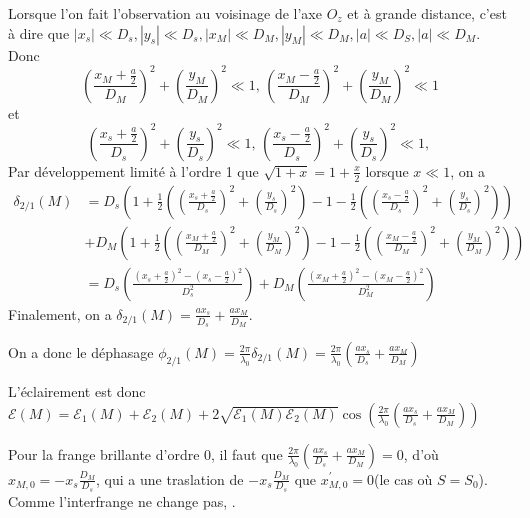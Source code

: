 \documentclass[a4paper,12pt]{book}
\begin{document}
Lorsque l'on fait l'observation au voisinage de l'axe $O_z$ et à grande distance, c'est à dire que 
$|x_s| \ll D_s, |y_s| \ll D_s, |x_M| \ll D_M, |y_M| \ll D_M, |a| \ll D_S, |a| \ll D_M$. 
Donc 
$$
\left(\frac{x_M+\frac{a}{2}}{D_M}\right)^2+\left(\frac{y_M}{D_M}\right)^2\ll 1,\, 
\left(\frac{x_M-\frac{a}{2}}{D_M}\right)^2+\left(\frac{y_M}{D_M}\right)^2\ll 1
$$
et
$$
\left(\frac{x_s+\frac{a}{2}}{D_s}\right)^2+\left(\frac{y_s}{D_s}\right)^2\ll 1,\,
\left(\frac{x_s-\frac{a}{2}}{D_s}\right)^2+\left(\frac{y_s}{D_s}\right)^2\ll 1,\,
$$
Par développement limité à l'ordre 1 que $\sqrt{1+x} = 1+\frac{x}{2}$ lorsque $x\ll 1$, on a 
\begin{align*}
    \delta_{2/1}(M)&=D_s\left(1+\frac{1}{2}\left(\left(\frac{x_s+\frac{a}{2}}{D_s}\right)^2+\left(\frac{y_s}{D_s}\right)^2\right)-1
                 -\frac{1}{2}\left(\left(\frac{x_s-\frac{a}{2}}{D_s}\right)^2+\left(\frac{y_s}{D_s}\right)^2\right)\right)\\
                   &+D_M\left(1+\frac{1}{2}\left(\left(\frac{x_M+\frac{a}{2}}{D_M}\right)^2+\left(\frac{y_M}{D_M}\right)^2\right)-1
                   -\frac{1}{2}\left(\left(\frac{x_M-\frac{a}{2}}{D_M}\right)^2+\left(\frac{y_M}{D_M}\right)^2\right)\right)\\
                   &=D_s\left(\frac{\left(x_s+\frac{a}{2}\right)^2-\left(x_s-\frac{a}{2}\right)^2}{D_s^2}\right)+
                   D_M\left(\frac{\left(x_M+\frac{a}{2}\right)^2-\left(x_M-\frac{a}{2}\right)^2}{D_M^2}\right)
\end{align*}
Finalement, on a $\boxed{\delta_{2/1}(M)=\frac{ax_s}{D_s}+\frac{ax_M}{D_M}}$. 

On a donc le déphasage $\phi_{2/1}(M)=\frac{2\pi}{\lambda_0}\delta_{2/1}(M)=\frac{2\pi}{\lambda_0}\left(\frac{ax_s}{D_s}+\frac{ax_M}{D_M}\right)$

L'éclairement est donc $\boxed{\mathcal{E}(M)=\mathcal{E}_1(M)+\mathcal{E}_2(M)+2\sqrt{\mathcal{E}_1(M)\mathcal{E}_2(M)}\cos\left(\frac{2\pi}{\lambda_0}\left(\frac{ax_s}{D_s}+\frac{ax_M}{D_M}\right)\right)}$

Pour la frange brillante d'ordre 0, il faut que $\frac{2\pi}{\lambda_0}\left(\frac{ax_s}{D_s}+\frac{ax_M}{D_M}\right)=0$, d'où $x_{M,0}=-x_s\frac{D_M}{D_s}$, 
qui a une traslation de $-x_s\frac{D_M}{D_s}$ que $x_{M,0}^{'}=0$(le cas où $S=S_0$). Comme l'interfrange ne change pas, .
\end{document}
